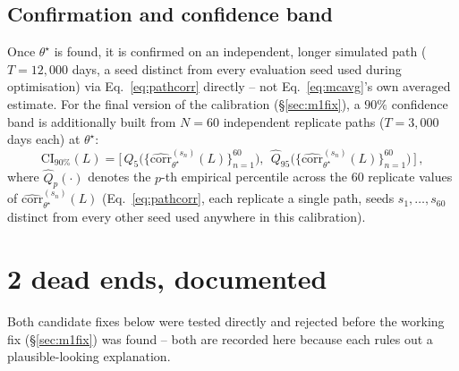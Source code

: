 \documentclass[11pt]{article}
\begin{document}
\subsection{Confirmation and confidence band}
Once $\theta^\star$ is found, it is confirmed on an independent, longer
simulated path ($T=12{,}000$ days, a seed distinct from every evaluation
seed used during optimisation) via Eq.~\ref{eq:pathcorr} directly -- not
Eq.~\ref{eq:mcavg}'s own averaged estimate. For the final version of the
calibration (\S\ref{sec:m1fix}), a $90\%$ confidence band is additionally
built from $N=60$ independent replicate paths ($T=3{,}000$ days each) at
$\theta^\star$:
\begin{equation}
\text{CI}_{90\%}(L) = \Big[\,
\widehat{Q}_{5}\big(\{\widehat{\text{corr}}_{\theta^\star}^{(s_n)}(L)\}_{n=1}^{60}\big),\ \
\widehat{Q}_{95}\big(\{\widehat{\text{corr}}_{\theta^\star}^{(s_n)}(L)\}_{n=1}^{60}\big)
\,\Big]\, ,
\label{eq:ci}
\end{equation}
where $\widehat{Q}_p(\cdot)$ denotes the $p$-th empirical percentile across
the 60 replicate values of $\widehat{\text{corr}}_{\theta^\star}^{(s_n)}(L)$
(Eq.~\ref{eq:pathcorr}, each replicate a single path, seeds
$s_1,\dots,s_{60}$ distinct from every other seed used anywhere in this
calibration).

\section{2 dead ends, documented}
\label{sec:deadends}
Both candidate fixes below were tested directly and rejected before the
working fix (\S\ref{sec:m1fix}) was found -- both are recorded here because
each rules out a plausible-looking explanation.
\end{document}
